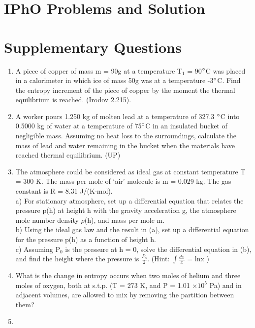 \section{IPhO Problems and Solution}
\section{Supplementary Questions}
\begin{enumerate}
    \item A piece of copper of mass m = 90g at a temperature T$_1$ = 90{$\degree$}C was placed in a calorimeter in which ice of mass 50g was at a temperature -3{$\degree$}C. Find the entropy increment of the piece of copper by the moment the thermal equilibrium is reached. (Irodov 2.215).\\
    
    \item A worker pours 1.250 kg of molten lead at a temperature of 327.3 $\degree$C into 0.5000 kg of water at a temperature of 75$\degree$C in an insulated bucket of negligible mass. Assuming no heat loss to the surroundings, calculate the mass of lead and water remaining in the bucket when the materials have reached thermal equilibrium. (UP)\\
    

\item The atmosphere could be considered as ideal gas at constant temperature T = 300 K. The mass per mole of ‘air’ molecule is m = 0.029 kg. The gas constant is R = 8.31 J/(K$\cdot$mol).\\

a) For stationary atmosphere, set up a differential equation that relates the pressure p(h) at height h with the gravity acceleration g, the atmosphere mole number density $\rho$(h), and mass per mole m.\\

b)	Using the ideal gas law and the result in (a), set up a differential equation for the pressure p(h) as a function of height h.\\

c) Assuming P$_0$ is the pressure at h = 0, solve the differential equation in (b), and find the height where the pressure is $\frac{P_o}{2}$. (Hint: $\int\frac{dx}{x}$ = lnx )

\item What is the change in entropy occurs when two moles of helium and three moles of oxygen, both at s.t.p. (T = 273 K, and P = 1.01 $\times 10^5$ Pa) and in adjacent volumes, are allowed to mix by removing the partition between them? 

\item 
\end{enumerate}